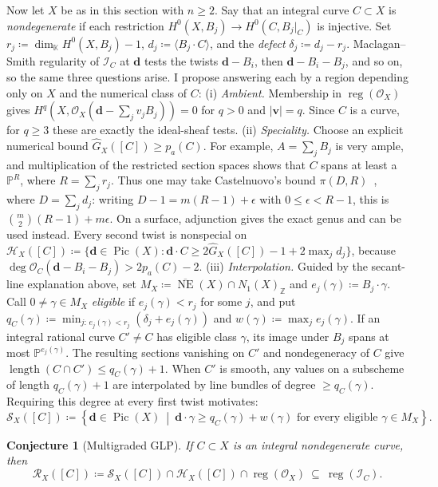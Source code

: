\documentclass[11pt,reqno]{amsart}
\newtheorem{conjecture}[lemma]{Conjecture}
\theoremstyle{remark}
\newcommand{\reg}{\operatorname{reg}}
\newcommand{\length}{\operatorname{length}}
\newcommand{\Pic}{\operatorname{Pic}}
\newcommand{\dd}{\mathbf{d}}
\newcommand{\vv}{\mathbf{v}}
\newcommand{\KK}{\mathbb{K}}
\newcommand{\PP}{\mathbb{P}}
\newcommand{\ZZ}{\mathbb{Z}}
\newcommand{\cH}{\mathcal{H}}
\newcommand{\cI}{\mathcal{I}}
\newcommand{\cO}{\mathcal{O}}
\newcommand{\cR}{\mathcal{R}}
\newcommand{\cS}{\mathcal{S}}
\begin{document}
Now let $X$ be as in this section with $n\geq2$. Say that an integral curve $C\subset X$ is \emph{nondegenerate} if each restriction $H^0(X,B_j)\to H^0(C,B_j|_C)$ is injective. Set $r_j\coloneqq\dim_\KK H^0(X,B_j)-1$, $d_j\coloneqq\langle B_j\cdot C\rangle$, and the \emph{defect} $\delta_j\coloneqq d_j-r_j$. Maclagan--Smith regularity of $\cI_C$ at $\dd$ tests the twists $\dd-B_i$, then $\dd-B_i-B_j$, and so on, so the same three questions arise. I propose answering each by a region depending only on $X$ and the numerical class of $C$: (i) \emph{Ambient.} Membership in $\reg(\cO_X)$ gives $H^q(X,\cO_X(\dd-\sum_jv_jB_j))=0$ for $q>0$ and $|\vv|=q$. Since $C$ is a curve, for $q\geq3$ these are exactly the ideal-sheaf tests. (ii) \emph{Speciality.} Choose an explicit numerical bound $\widehat G_X([C])\geq p_a(C)$. For example, $A=\sum_jB_j$ is very ample, and multiplication of the restricted section spaces shows that $C$ spans at least a $\PP^R$, where $R=\sum_jr_j$. Thus one may take Castelnuovo's bound $\pi(D,R)$~\cite[Ch.~III]{ACGH85}, where $D=\sum_jd_j$: writing $D-1=m(R-1)+\epsilon$ with $0\leq\epsilon<R-1$, this is $\binom{m}{2}(R-1)+m\epsilon$. On a surface, adjunction gives the exact genus and can be used instead. Every second twist is nonspecial on $\cH_X([C])\coloneqq\{\dd\in\Pic(X) : \dd\cdot C\geq2\widehat G_X([C])-1+2\max_j d_j\}$, because $\deg\cO_C(\dd-B_i-B_j)>2p_a(C)-2$. (iii) \emph{Interpolation.} Guided by the secant-line explanation above, set $M_X\coloneqq\overline{\operatorname{NE}}(X)\cap N_1(X)_{\ZZ}$ and $e_j(\gamma)\coloneqq B_j\cdot\gamma$. Call $0\neq\gamma\in M_X$ \emph{eligible} if $e_j(\gamma)<r_j$ for some $j$, and put $q_C(\gamma)\coloneqq\min_{j:\,e_j(\gamma)<r_j}(\delta_j+e_j(\gamma))$ and $w(\gamma)\coloneqq\max_je_j(\gamma)$.
If an integral rational curve $C'\neq C$ has eligible class $\gamma$, its image under $B_j$ spans at most $\PP^{e_j(\gamma)}$. The resulting sections vanishing on $C'$ and nondegeneracy of $C$ give $\length(C\cap C')\leq q_C(\gamma)+1$. When $C'$ is smooth, any values on a subscheme of length $q_C(\gamma)+1$ are interpolated by line bundles of degree $\geq q_C(\gamma)$. Requiring this degree at every first twist motivates:
\[
\cS_X([C])\coloneqq
\left\{\dd\in\Pic(X)\ \middle|\
\dd\cdot\gamma\geq q_C(\gamma)+w(\gamma)
\text{ for every eligible }\gamma\in M_X\right\}.
\]

\begin{conjecture}[Multigraded GLP]\label{conj:multigraded-glp}
If $C\subset X$ is an integral nondegenerate curve, then
\[
\cR_X([C])\coloneqq\cS_X([C])\cap\cH_X([C])\cap\reg(\cO_X)\ \subseteq\ \reg(\cI_C).
\]
\end{conjecture}
\end{document}
